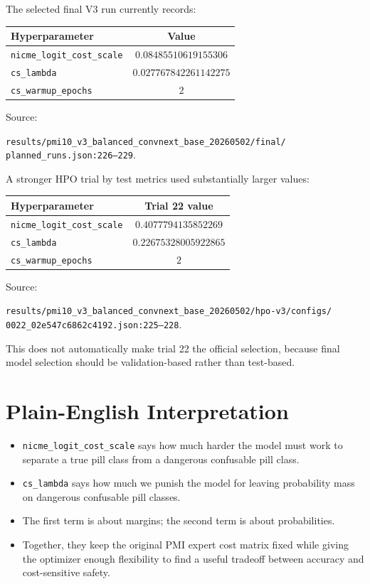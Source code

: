 \documentclass[11pt]{article}
\newcommand{\code}[1]{\texttt{#1}}
\newcommand{\pathref}[1]{\texttt{\small #1}}
\begin{document}
The selected final V3 run currently records:

\begin{center}
\begin{tabular}{lc}
\toprule
Hyperparameter & Value \\
\midrule
\code{nicme\_logit\_cost\_scale} & $0.08485510619155306$ \\
\code{cs\_lambda} & $0.027767842261142275$ \\
\code{cs\_warmup\_epochs} & $2$ \\
\bottomrule
\end{tabular}
\end{center}

\noindent Source:
\begin{flushleft}
\pathref{results/pmi10\_v3\_balanced\_convnext\_base\_20260502/final/}\\
\pathref{planned\_runs.json:226--229}.
\end{flushleft}

A stronger HPO trial by test metrics used substantially larger values:

\begin{center}
\begin{tabular}{lc}
\toprule
Hyperparameter & Trial 22 value \\
\midrule
\code{nicme\_logit\_cost\_scale} & $0.4077794135852269$ \\
\code{cs\_lambda} & $0.22675328005922865$ \\
\code{cs\_warmup\_epochs} & $2$ \\
\bottomrule
\end{tabular}
\end{center}

\noindent Source:
\begin{flushleft}
\pathref{results/pmi10\_v3\_balanced\_convnext\_base\_20260502/hpo-v3/configs/}\\
\pathref{0022\_02e547c6862c4192.json:225--228}.
\end{flushleft}
This does not automatically make trial 22 the official selection, because final model selection should be validation-based rather than test-based.

\section{Plain-English Interpretation}

\begin{itemize}
  \item \code{nicme\_logit\_cost\_scale} says how much harder the model must work to separate a true pill class from a dangerous confusable pill class.
  \item \code{cs\_lambda} says how much we punish the model for leaving probability mass on dangerous confusable pill classes.
  \item The first term is about margins; the second term is about probabilities.
  \item Together, they keep the original PMI expert cost matrix fixed while giving the optimizer enough flexibility to find a useful tradeoff between accuracy and cost-sensitive safety.
\end{itemize}
\end{document}
